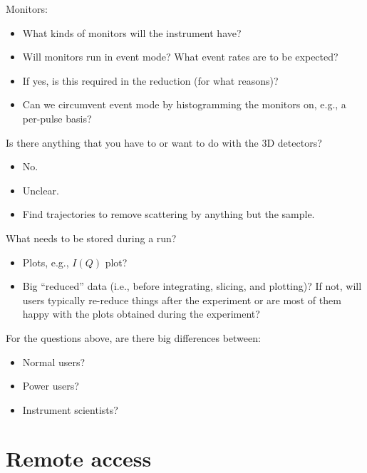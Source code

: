 \documentclass[a4paper,english,numbers=noenddot,bibliography=totoc,chapterprefix=on,DIV=12]{scrartcl}
\begin{document}
\begin{enumerate}
    {\color{black!60}
  \item Monitors:
    \begin{itemize}
      \item What kinds of monitors will the instrument have?
      \item Will monitors run in event mode?
        What event rates are to be expected?
      \item If yes, is this required in the reduction (for what reasons)?
      \item Can we circumvent event mode by histogramming the monitors on, e.g., a per-pulse basis?
    \end{itemize}
  }
  {\color{black!60}
\item Is there anything that you have to or want to do with the 3D detectors?
  \begin{itemize}
    \item No.
    \item Unclear.
    \item Find trajectories to remove scattering by anything but the sample.
  \end{itemize}
}
  \item What needs to be stored during a run?
    \begin{itemize}
      \item Plots, e.g., $I(Q)$ plot?
      \item Big ``reduced'' data (i.e., before integrating, slicing, and plotting)?
        {\color{black!60}
        If not, will users typically re-reduce things after the experiment or are most of them happy with the plots obtained during the experiment?
      }
  \end{itemize}
\item For the questions above, are there big differences between:
  \begin{itemize}
    \item Normal users?
    \item Power users?
    \item Instrument scientists?
  \end{itemize}
\end{enumerate}


\section {Remote access}
\end{document}
